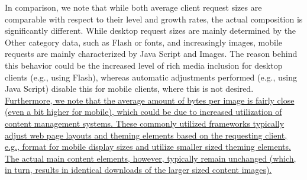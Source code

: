 \documentclass[onecolumn,12pt]{IEEEtran}
\begin{document}
In comparison, we note that while both average client request sizes are comparable with respect to their level and growth rates, the actual composition is significantly different. 
While desktop request sizes are mainly determined by the Other category data, such as Flash or fonts, and increasingly images, mobile requests are mainly characterized by Java Script and Images.
The reason behind this behavior could be the increased level of rich media inclusion for desktop clients (e.g., using Flash), whereas automatic adjustments performed (e.g., using Java Script) disable this for mobile clients, where this is not desired. 
\uline{Furthermore, we note that the average amount of bytes per image is fairly close (even a bit higher for mobile), which could be due to increased utilization of content management systems.
These commonly utilized frameworks typically adjust web page layouts and theming elements based on the requesting client, e.g., format for mobile display sizes and utilize smaller sized theming elements. The actual main content elements, however, typically remain unchanged (which, in turn, results in identical downloads of the larger sized content images).}
\end{document}
